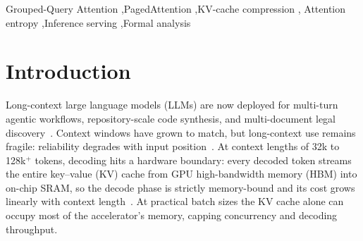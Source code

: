 \documentclass[final,5p,times,twocolumn]{elsarticle}
\theoremstyle{definition}
\theoremstyle{remark}
\newcommand{\method}{Page-EntroKV}
\begin{document}
\begin{frontmatter}
\begin{abstract}
On a pilot architecture (Qwen2.5-1.5B-Instruct, $r{=}6$, 28 layers),
head-independent replay inflates the cache by up to $5.1\times$ at a
 $2\%$ budget---with the theoretical certificate firing in the large
majority of measured cells---while \method{} holds the union overhead
at exactly $1.000$ across 1{,}008 pooled measurements. Across a
1{,}008-observation head census, sink isolation inverts the
sink-to-context weight ordering from a $2.10\times$ unearned sink
advantage to a $0.66\times$ deficit. In pilot-scale needle retrieval,
entropy-weighted pooling retains the needle where arithmetic-mean
pooling collapses ($100\%$ vs.\ $0\%$ under the pooled-selection
criterion at a $20\%$ budget); strict all-layer retention is reported
as a limitation. Retained cardinality is exact for every page size,
preliminary runs show representative QA and code tasks remain solvable
at $20\%$ retention, and the mechanism ablations are certified over all
56 of 56 layer--group pairs with zero skipped layers. Larger-model,
long-context, and serving phases are pre-registered and in progress.
\end{abstract}

\begin{keyword}
Grouped-Query Attention \sep PagedAttention \sep KV-cache compression \sep
Attention entropy \sep Inference serving \sep Formal analysis
\end{keyword}

\end{frontmatter}

\section{Introduction}
\label{sec:introduction}

Long-context large language models (LLMs) are now deployed for
multi-turn agentic workflows, repository-scale code synthesis, and
multi-document legal
discovery~\cite{bai2023longbench,hsieh2024ruler,meta2024llama3}.
Context windows have grown to match, but long-context use remains
fragile: reliability degrades with input position~\cite{liu2023lost}.
At context lengths of 32k to 128k$^{+}$ tokens, decoding hits a hardware
boundary: every decoded token streams the entire key--value (KV) cache
from GPU high-bandwidth memory (HBM) into on-chip SRAM, so the decode
phase is strictly memory-bound and its cost grows linearly with context
length~\cite{pope2022scaling,kwon2023vllm}. At practical batch sizes the
KV cache alone can occupy most of the accelerator's memory, capping
concurrency and decoding throughput.
\end{document}
